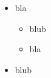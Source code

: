 \documentclass{beamer}
\newcommand{\cmark}{\ding{51}}%
\newcommand{\xmark}{\ding{55}}%
\newcommand{\done}{\rlap{$\square$}{\raisebox{2pt}{\large\hspace{1pt}\cmark}}%
    \hspace{-2.5pt}}
\newcommand{\wontfix}{\rlap{$\square$}{\large\hspace{1pt}\xmark}}
\begin{document}
    \begin{frame}
        \begin{itemize}[<+->]
            \item bla

            \begin{itemize}[<+->]
                \item[\done] blub
                \item[\wontfix] bla
            \end{itemize}

            \item blub
        \end{itemize}
    \end{frame} 
\end{document}
